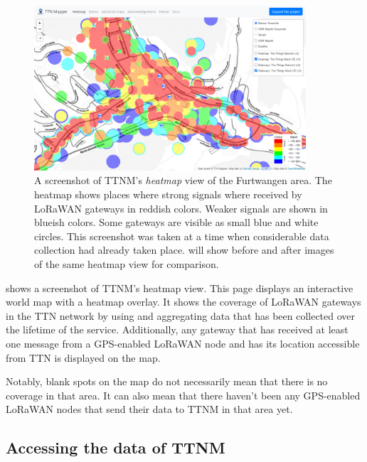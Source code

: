 \begin{figure}[htbp]
    \centering
    \includegraphics[width=0.9\textwidth]{pictures/ttn-mapper/heatmap_with_gateways.png}
    \caption{
        A screenshot of \ac{TTNM}'s \emph{heatmap} view of the Furtwangen area.
        The heatmap shows places where strong signals where received by \ac{LoRaWAN} gateways in reddish colors.
        Weaker signals are shown in blueish colors.
        Some gateways are visible as small blue and white circles.
        This screenshot was taken at a time when considerable data collection had already taken place.
         will show before and after images of the same heatmap view for comparison.~\protect\cite{ttn_mapper_ttn_2023}
    }\label{pic:ttn-mapper-heatmap-with-gateways}
\end{figure}

 shows a screenshot of \acl{TTNM}'s heatmap view.
This page displays an interactive world map with a heatmap overlay.
It shows the coverage of \ac{LoRaWAN} gateways in the \ac{TTN} network by using and aggregating data that has been collected over the lifetime of the service.
Additionally, any gateway that has received at least one message from a \ac{GPS}-enabled \ac{LoRaWAN} node and has its location accessible from \ac{TTN} is displayed on the map.

Notably, blank spots on the map do not necessarily mean that there is no coverage in that area.
It can also mean that there haven't been any \ac{GPS}-enabled \ac{LoRaWAN} nodes that send their data to \ac{TTNM} in that area yet.

\subsection{Accessing the data of \acl{TTNM}}


